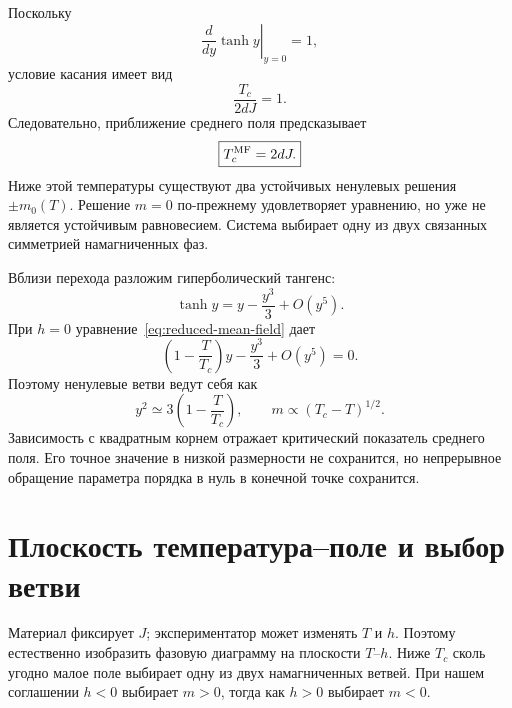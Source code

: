 Поскольку
\begin{equation}
\left.\frac{d}{dy}\tanh y\right|_{y=0}=1,
\end{equation}
условие касания имеет вид
\begin{equation}
\frac{T_c}{2dJ}=1.
\end{equation}
Следовательно, приближение среднего поля предсказывает
\begin{equation}
\boxed{T_c^{\rm MF}=2dJ.}
\label{eq:sm10-mean-field-tc}
\end{equation}
Ниже этой температуры существуют два устойчивых ненулевых решения \(\pm m_0(T)\). Решение \(m=0\) по-прежнему удовлетворяет уравнению, но уже не является устойчивым равновесием. Система выбирает одну из двух связанных симметрией намагниченных фаз.

\begin{classroomqa}
\end{classroomqa}

Вблизи перехода разложим гиперболический тангенс:
\begin{equation}
\tanh y=y-\frac{y^3}{3}+O(y^5).
\end{equation}
При \(h=0\) уравнение~\eqref{eq:reduced-mean-field} дает
\begin{equation}
\left(1-\frac{T}{T_c}\right)y-\frac{y^3}{3}+O(y^5)=0.
\end{equation}
Поэтому ненулевые ветви ведут себя как
\begin{equation}
y^2\simeq3\left(1-\frac{T}{T_c}\right),
\qquad
m\propto(T_c-T)^{1/2}.
\label{eq:mf-beta-exponent}
\end{equation}
Зависимость с квадратным корнем отражает критический показатель среднего поля. Его точное значение в низкой размерности не сохранится, но непрерывное обращение параметра порядка в нуль в конечной точке сохранится.

\section{Плоскость температура--поле и выбор ветви}

Материал фиксирует \(J\); экспериментатор может изменять \(T\) и \(h\). Поэтому естественно изобразить фазовую диаграмму на плоскости \(T\)--\(h\). Ниже \(T_c\) сколь угодно малое поле выбирает одну из двух намагниченных ветвей. При нашем соглашении \(h<0\) выбирает \(m>0\), тогда как \(h>0\) выбирает \(m<0\).

